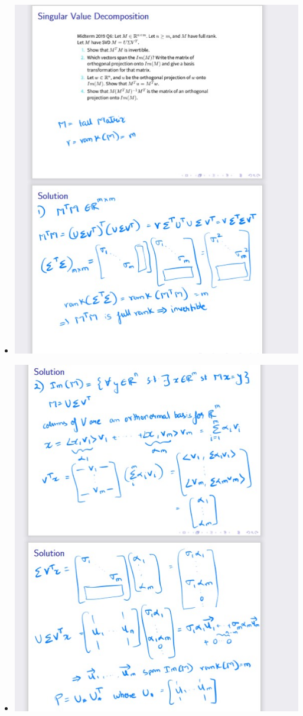 \documentclass[12pt,twoside]{article}
\begin{document}
\begin{itemize}
\item \includegraphics[width=15cm]{final Review/lab 8 part 1 .jpg}
\item \includegraphics[width=15cm]{final Review/lab 8 part 2 .jpg}

\end{itemize}
\end{document}
